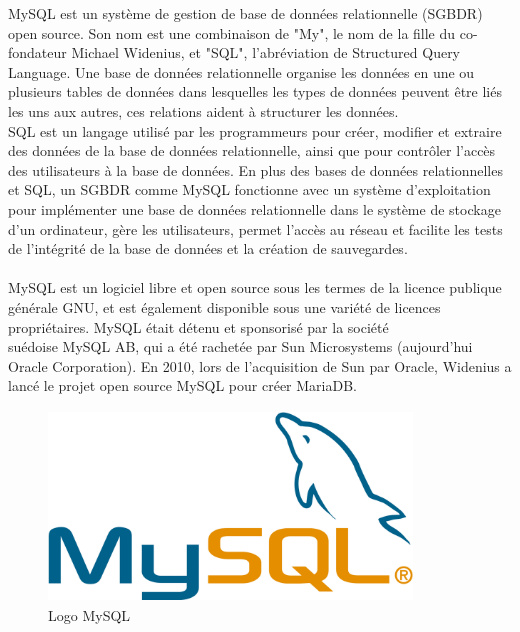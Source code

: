 \documentclass[12pt]{report}
\begin{document}
MySQL est un système de gestion de base de données relationnelle (SGBDR) open source. Son nom est une combinaison de "My", le nom de la fille du co-fondateur Michael Widenius, et "SQL", l'abréviation de Structured Query Language. Une base de données relationnelle organise les données en une ou plusieurs tables de données dans lesquelles les types de données peuvent être liés les uns aux autres, ces relations aident à structurer les données.
\\
SQL est un langage utilisé par les programmeurs pour créer, modifier et extraire des données de la base de données relationnelle, ainsi que pour contrôler l'accès des utilisateurs à la base de données. En plus des bases de données relationnelles et SQL, un SGBDR comme MySQL fonctionne avec un système d'exploitation pour implémenter une base de données relationnelle dans le système de stockage d'un ordinateur, gère les utilisateurs, permet l'accès au réseau et facilite les tests de l'intégrité de la base de données et la création de sauvegardes.
\\\\
MySQL est un logiciel libre et open source sous les termes de la licence publique générale GNU, et est également disponible sous une variété de licences propriétaires. MySQL était détenu et sponsorisé par la société \\suédoise MySQL AB, qui a été rachetée par Sun Microsystems (aujourd'hui Oracle Corporation). En 2010, lors de l'acquisition de Sun par Oracle, Widenius a lancé le projet open source MySQL pour créer MariaDB.

\vspace{0.7in}

\begin{figure}[h]
\centering
    \includegraphics[width = 3.8in, height = 2in]{../Images/MySQL.png}
\vspace{0.1in}
\caption{Logo MySQL}
\end{figure}

\newpage
\end{document}
